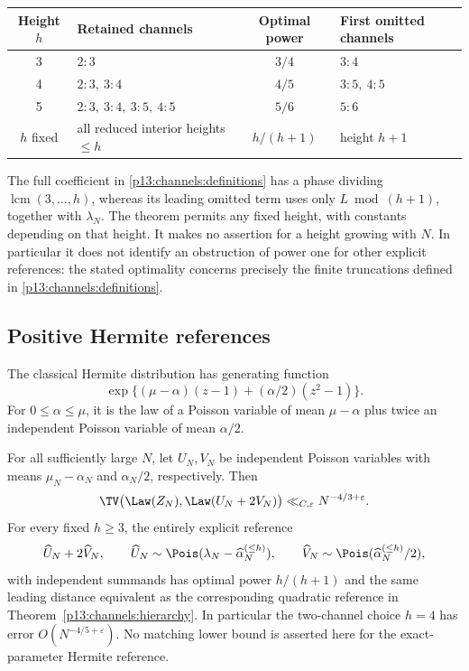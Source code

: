 \begin{center}
\begin{tabular}{@{}clcl@{}}
\toprule
Height $h$ & Retained channels & Optimal power & First omitted channels\\
\midrule
3 & $2:3$ & $3/4$ & $3:4$\\
4 & $2:3,\ 3:4$ & $4/5$ & $3:5,\ 4:5$\\
5 & $2:3,\ 3:4,\ 3:5,\ 4:5$ & $5/6$ & $5:6$\\
$h$ fixed & all reduced interior heights $\leq h$
   & $h/(h+1)$ & height $h+1$\\
\bottomrule
\end{tabular}
\end{center}

The full coefficient in \eqref{p13:channels:definitions} has a phase
dividing $\operatorname{lcm}(3,\ldots,h)$, whereas its leading omitted
term uses only $L\bmod(h+1)$, together with $\lambda_N$.
The theorem permits any fixed height, with constants depending on that
height.  It makes no assertion for a height growing with $N$.
In particular it does not identify an obstruction of power one for
other explicit references: the stated optimality concerns precisely the
finite truncations defined in \eqref{p13:channels:definitions}.

\subsection{Positive Hermite references}

The classical Hermite distribution \cite{kempkemp1965} has generating
function
\[
 \exp\{(\mu-\alpha)(z-1)+(\alpha/2)(z^2-1)\}.
\]
For \(0\le\alpha\le\mu\), it is the law of a Poisson variable
of mean \(\mu-\alpha\) plus twice an independent Poisson variable
of mean \(\alpha/2\).

\begin{corollary}
\label{p1:cor:compound}
For all sufficiently large \(N\), let \(U_N,V_N\) be independent
Poisson variables with means \(\mu_N-\alpha_N\) and
\(\alpha_N/2\), respectively. Then
\[
 \TV\bigl(\Law(Z_N),\Law(U_N+2V_N)\bigr)
       \ll_{C,\varepsilon}N^{-4/3+\varepsilon}.
\]
For every fixed \(h\ge3\), the entirely explicit reference
\[
 \widehat U_N+2\widehat V_N,\qquad
 \widehat U_N\sim\Pois(\lambda_N-\widehat\alpha_N^{(\le h)}),\qquad
 \widehat V_N\sim\Pois(\widehat\alpha_N^{(\le h)}/2),
\]
with independent summands has optimal power \(h/(h+1)\)
and the same leading distance equivalent as the corresponding
quadratic reference in Theorem~\ref{p13:channels:hierarchy}.
In particular the two-channel choice \(h=4\) has
error \(O(N^{-4/5+\varepsilon})\).
No matching lower bound is asserted here for the
exact-parameter Hermite reference.
\end{corollary}


